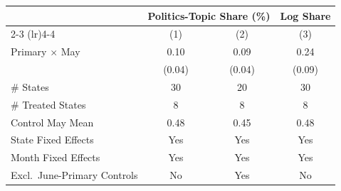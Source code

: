 \begin{tabular}{lccc}
\toprule \toprule
 & \multicolumn{2}{c}{Politics-Topic Share (\%)} & Log Share \\
\cmidrule(lr){2-3} \cmidrule(lr){4-4}
 & (1) & (2) & (3) \\
\midrule
Primary $\times$ May & 0.10 & 0.09 & 0.24 \\
 & (0.04) & (0.04) & (0.09) \\[2mm]
\# States & 30 & 20 & 30 \\
\# Treated States & 8 & 8 & 8 \\
Control May Mean & 0.48 & 0.45 & 0.48 \\
\midrule
State Fixed Effects & Yes & Yes & Yes \\
Month Fixed Effects & Yes & Yes & Yes \\
Excl.\ June-Primary Controls & No & Yes & No \\
\bottomrule \bottomrule
\end{tabular}
